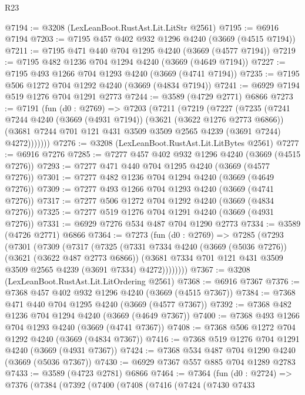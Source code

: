 \begin{lexlean}{R23}
\begin{coremodule}
@7194 := @3208 (LexLeanBoot.RustAst.Lit.LitStr @2561)
@7195 := @6916 @7194
@7203 := @7195 @457 @402 @932 @1296 @4240 (@3669 (@4515 @7194))
@7211 := @7195 @471 @440 @704 @1295 @4240 (@3669 (@4577 @7194))
@7219 := @7195 @482 @1236 @704 @1294 @4240 (@3669 (@4649 @7194))
@7227 := @7195 @493 @1266 @704 @1293 @4240 (@3669 (@4741 @7194))
@7235 := @7195 @506 @1272 @704 @1292 @4240 (@3669 (@4834 @7194))
@7241 := @6929 @7194 @519 @1276 @704 @1291 @2773
@7244 := @3589 (@4729 @2771) @6866
@7273 := @7191
    (fun (d0 : @2769) =>
    @7203
      (@7211
        (@7219
          (@7227
            (@7235
              (@7241
                @7244
                @4240
                (@3669 (@4931 @7194))
                (@3621 (@3622 @1276 @2773 @6866))
                (@3681 @7244 @701 @121 @431 @3509 @3509 @2565 @4239 (@3691 @7244) @4272)))))))
@7276 := @3208 (LexLeanBoot.RustAst.Lit.LitBytes @2561)
@7277 := @6916 @7276
@7285 := @7277 @457 @402 @932 @1296 @4240 (@3669 (@4515 @7276))
@7293 := @7277 @471 @440 @704 @1295 @4240 (@3669 (@4577 @7276))
@7301 := @7277 @482 @1236 @704 @1294 @4240 (@3669 (@4649 @7276))
@7309 := @7277 @493 @1266 @704 @1293 @4240 (@3669 (@4741 @7276))
@7317 := @7277 @506 @1272 @704 @1292 @4240 (@3669 (@4834 @7276))
@7325 := @7277 @519 @1276 @704 @1291 @4240 (@3669 (@4931 @7276))
@7331 := @6929 @7276 @534 @487 @704 @1290 @2773
@7334 := @3589 (@4726 @2771) @6866
@7364 := @7273
    (fun (d0 : @2769) =>
    @7285
      (@7293
        (@7301
          (@7309
            (@7317
              (@7325
                (@7331
                  @7334
                  @4240
                  (@3669 (@5036 @7276))
                  (@3621 (@3622 @487 @2773 @6866))
                  (@3681 @7334 @701 @121 @431 @3509 @3509 @2565 @4239 (@3691 @7334) @4272))))))))
@7367 := @3208 (LexLeanBoot.RustAst.Lit.LitOrdering @2561)
@7368 := @6916 @7367
@7376 := @7368 @457 @402 @932 @1296 @4240 (@3669 (@4515 @7367))
@7384 := @7368 @471 @440 @704 @1295 @4240 (@3669 (@4577 @7367))
@7392 := @7368 @482 @1236 @704 @1294 @4240 (@3669 (@4649 @7367))
@7400 := @7368 @493 @1266 @704 @1293 @4240 (@3669 (@4741 @7367))
@7408 := @7368 @506 @1272 @704 @1292 @4240 (@3669 (@4834 @7367))
@7416 := @7368 @519 @1276 @704 @1291 @4240 (@3669 (@4931 @7367))
@7424 := @7368 @534 @487 @704 @1290 @4240 (@3669 (@5036 @7367))
@7430 := @6929 @7367 @557 @885 @704 @1289 @2783
@7433 := @3589 (@4723 @2781) @6866
@7464 := @7364
    (fun (d0 : @2724) =>
    @7376
      (@7384
        (@7392
          (@7400
            (@7408
              (@7416
                (@7424
                  (@7430
                    @7433

\end{coremodule}
\end{lexlean}
